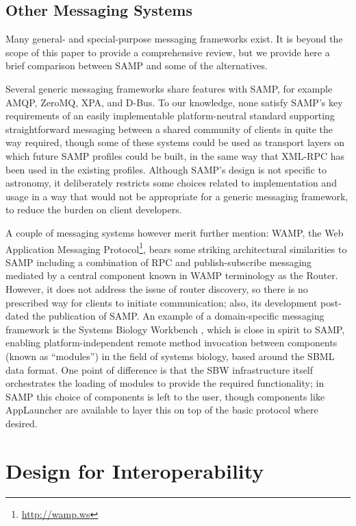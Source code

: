 \documentclass[5p]{elsarticle}
\begin{document}
\subsection{Other Messaging Systems}

Many general- and special-purpose messaging frameworks exist.
It is beyond the scope of this paper to provide a comprehensive
review, but we provide here a brief comparison between SAMP and
some of the alternatives.

Several generic messaging frameworks share features with SAMP, 
for example AMQP, ZeroMQ, XPA, and D-Bus.
To our knowledge, none
satisfy SAMP's key requirements of an easily implementable
platform-neutral standard supporting straightforward messaging
between a shared community of clients in quite the way required,
though some of these systems could be used as transport layers on
which future SAMP profiles could be built, in the same way
that XML-RPC has been used in the existing profiles.
Although SAMP's design is not specific to astronomy,
it deliberately restricts some choices related to implementation
and usage in a way that would not be
appropriate for a generic messaging framework,
to reduce the burden on client developers.

A couple of messaging systems however merit further mention:
WAMP, the Web Application Messaging Protocol\footnote{\url{http://wamp.ws}}, 
bears some striking architectural similarities to SAMP including 
a combination of RPC and publish-subscribe messaging mediated by 
a central component known in WAMP terminology as the Router.
However, it does not address the issue of router discovery,
so there is no prescribed way for clients to initiate communication;
also, its development post-dated the publication of SAMP.
An example of a domain-specific messaging framework is
the Systems Biology Workbench \citep{sbw},
which is close in spirit to SAMP, enabling platform-independent 
remote method invocation between components (known as ``modules'') 
in the field of systems biology, based around the SBML data format.
One point of difference is that
the SBW infrastructure itself orchestrates the loading of
modules to provide the required functionality;
in SAMP this choice of components is left to the user,
though components like AppLauncher
\citep{2012ASPC..461..379L} are available to
layer this on top of the basic protocol where desired.


\section{Design for Interoperability} \label{sec:design}
\end{document}
